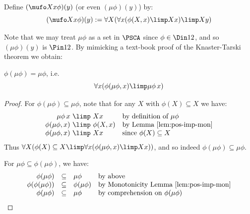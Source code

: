 \begin{definition}
Define $(\mufo X x \phi)(y)$ (or even $(\mu\phi)(y)$) by:
\[
(\mufo X x \phi) (y) := \forall X (\forall x ( \phi(X,x) \limp Xx ) \limp Xy)
\]
\end{definition}
Note that we may treat $\mu\phi$ as a set in $\PSCA$ since $\phi\in \Din 1 2$, and so $(\mu\phi)(y) $ is $ \Pin 1 2$.
By mimicking a text-book proof of the Knaster-Tarski theorem we obtain:
\begin{proposition}
    \label{prop:kt-for-least-pre-fixed-point}
    $\phi(\mu\phi)= \mu \phi$, i.e.\ 
    \[
    \forall x (\phi(\mu\phi,x) \limp \mu\phi\, x)
    \]
\end{proposition}
\begin{proof}
    For $\phi(\mu\phi)\subseteq \mu\phi$, note that for any $X$ with $\phi(X)\subseteq X$ we have:
    \[
    \begin{array}{r@{\ \limp \ }ll}
         \mu\phi\, x & Xx & \text{by definition of $\mu\phi$} \\
         \phi(\mu\phi,x) & \phi(X,x) & \text{by Lemma~\ref{lem:pos-imp-mon}}\\ 
         \phi(\mu\phi,x) & Xx & \text{since $\phi(X)\subseteq X$}
    \end{array}
    \]
    Thus $\forall X(\phi(X)\subseteq X \limp \forall x ( \phi(\mu\phi,x) \limp Xx)) $, and so indeed $\phi(\mu\phi)\subseteq \mu\phi$.

    For $\mu\phi \subseteq \phi(\mu\phi)$, we have:
    \[
    \begin{array}[b]{rcll}
         \phi(\mu\phi) &\subseteq & \mu\phi &\text{by above}\\
         \phi(\phi(\mu\phi)) & \subseteq &\phi(\mu\phi) & \text{by Monotonicity Lemma~\ref{lem:pos-imp-mon}}\\
         \phi(\mu\phi) & \subseteq & \mu\phi & \text{by comprehension on $\phi(\mu\phi)$} \tag*{\qed}
    \end{array}
    \]
    \renewcommand{\qed}{}
\end{proof}

